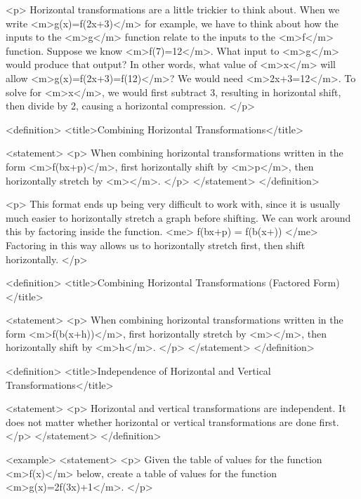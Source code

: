         <p>
            Horizontal transformations are a little trickier to think about.
            When we write <m>g(x)=f(2x+3)</m> for example, we have to think about how the inputs to the <m>g</m> function relate to the inputs to the <m>f</m> function.
            Suppose we know <m>f(7)=12</m>.
            What input to <m>g</m> would produce that output? In other words, what value of <m>x</m> will allow <m>g(x)=f(2x+3)=f(12)</m>? We would need <m>2x+3=12</m>.
            To solve for <m>x</m>, we would first subtract 3, resulting in horizontal shift, then divide by 2, causing a horizontal compression.
        </p>

        <definition>
            <title>Combining Horizontal Transformations</title>

            <statement>
                <p>
                    When combining horizontal transformations written in the form <m>f(bx+p)</m>, first horizontally shift by <m>p</m>, then horizontally stretch by <m></m>.
                </p>
            </statement>
        </definition>

        <p>
            This format ends up being very difficult to work with, since it is usually much easier to horizontally stretch a graph before shifting.
            We can work around this by factoring inside the function.
            <me>
                f(bx+p) = f(b(x+))
            </me>
            Factoring in this way allows us to horizontally stretch first, then shift horizontally.
        </p>

        <definition>
            <title>Combining Horizontal Transformations (Factored Form)</title>

            <statement>
                <p>
                    When combining horizontal transformations written in the form <m>f(b(x+h))</m>, first horizontally stretch by <m></m>, then horizontally shift by <m>h</m>.
                </p>
            </statement>
        </definition>

        <definition>
            <title>Independence of Horizontal and Vertical Transformations</title>

            <statement>
                <p>
                    Horizontal and vertical transformations are independent.
                    It does not matter whether horizontal or vertical transformations are done first.
                </p>
            </statement>
        </definition>

        <example>
            <statement>
                <p>
                    Given the table of values for the function <m>f(x)</m> below, create a table of values for the function <m>g(x)=2f(3x)+1</m>.
                </p>

